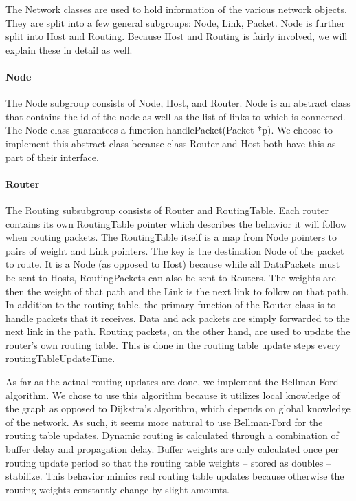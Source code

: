     The Network classes are used to hold information of the various network objects. They are split into a few general subgroups: Node, Link, Packet. Node is further split into Host and Routing. Because Host and Routing is fairly involved, we will explain these in detail as well. 

    \paragraph{Node} The Node subgroup consists of Node, Host, and Router. Node is an abstract class that contains the id of the node as well as the list of links to which is connected. The Node class guarantees a function handlePacket(Packet *p). We choose to implement this abstract class because class Router and Host both have this as part of their interface. 
    
    \paragraph{Router} The Routing subsubgroup consists of Router and RoutingTable. Each router contains its own RoutingTable pointer which describes the behavior it will follow when routing packets. The RoutingTable itself is a map from Node pointers to pairs of weight and Link pointers. The key is the destination Node of the packet to route. It is a Node (as opposed to Host) because while all DataPackets must be sent to Hosts, RoutingPackets can also be sent to Routers. The weights are then the weight of that path and the Link is the next link to follow on that path. In addition to the routing table, the primary function of the Router class is to handle packets that it receives. Data and ack packets are simply forwarded to the next link in the path. Routing packets, on the other hand, are used to update the router’s own routing table. This is done in the routing table update steps every routingTableUpdateTime. 

As far as the actual routing updates are done, we implement the Bellman-Ford algorithm. We chose to use this algorithm because it utilizes local knowledge of the graph as opposed to Dijkstra’s algorithm, which depends on global knowledge of the network. As such, it seems more natural to use Bellman-Ford for the routing table updates. Dynamic routing is calculated through a combination of buffer delay and propagation delay. Buffer weights are only calculated once per routing update period so that the routing table weights -- stored as doubles -- stabilize. This behavior mimics real routing table updates because otherwise the routing weights constantly change by slight amounts.

